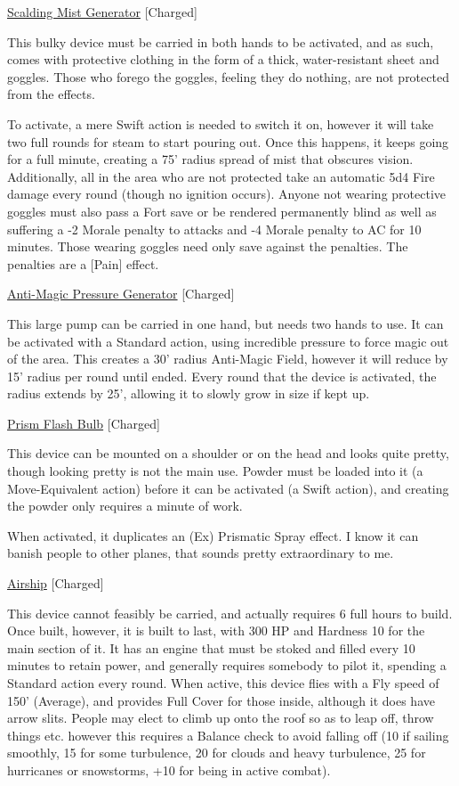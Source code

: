 \medskip\noindent\underline{Scalding Mist Generator} [Charged]

\noindent This bulky device must be carried in both hands to be activated, and as such, comes with protective clothing in the form of a thick, water-resistant sheet and goggles. Those who forego the goggles, feeling they do nothing, are not protected from the effects.

\smallskip\noindent To activate, a mere Swift action is needed to switch it on, however it will take two full rounds for steam to start pouring out. Once this happens, it keeps going for a full minute, creating a 75' radius spread of mist that obscures vision. Additionally, all in the area who are not protected take an automatic 5d4 Fire damage every round (though no ignition occurs). Anyone not wearing protective goggles must also pass a Fort save or be rendered permanently blind as well as suffering a -2 Morale penalty to attacks and -4 Morale penalty to AC for 10 minutes. Those wearing goggles need only save against the penalties. The penalties are a [Pain] effect.

\medskip\noindent\underline{Anti-Magic Pressure Generator} [Charged]

\noindent This large pump can be carried in one hand, but needs two hands to use. It can be activated with a Standard action, using incredible pressure to force magic out of the area. This creates a 30' radius Anti-Magic Field, however it will reduce by 15' radius per round until ended. Every round that the device is activated, the radius extends by 25', allowing it to slowly grow in size if kept up.

\medskip\noindent\underline{Prism Flash Bulb} [Charged]

\noindent This device can be mounted on a shoulder or on the head and looks quite pretty, though looking pretty is not the main use. Powder must be loaded into it (a Move-Equivalent action) before it can be activated (a Swift action), and creating the powder only requires a minute of work.

\smallskip\noindent When activated, it duplicates an (Ex) Prismatic Spray effect. I know it can banish people to other planes, that sounds pretty extraordinary to me.

\medskip\noindent\underline{Airship} [Charged]

\noindent This device cannot feasibly be carried, and actually requires 6 full hours to build. Once built, however, it is built to last, with 300 HP and Hardness 10 for the main section of it. It has an engine that must be stoked and filled every 10 minutes to retain power, and generally requires somebody to pilot it, spending a Standard action every round. When active, this device flies with a Fly speed of 150' (Average), and provides Full Cover for those inside, although it does have arrow slits. People may elect to climb up onto the roof so as to leap off, throw things etc. however this requires a Balance check to avoid falling off (10 if sailing smoothly, 15 for some turbulence, 20 for clouds and heavy turbulence, 25 for hurricanes or snowstorms, +10 for being in active combat).

